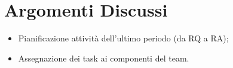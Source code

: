 \section{Argomenti Discussi}
	\begin{itemize}
		\item Pianificazione attività dell'ultimo periodo (da RQ a RA);
		\item Assegnazione dei task ai componenti del team.
	\end{itemize}